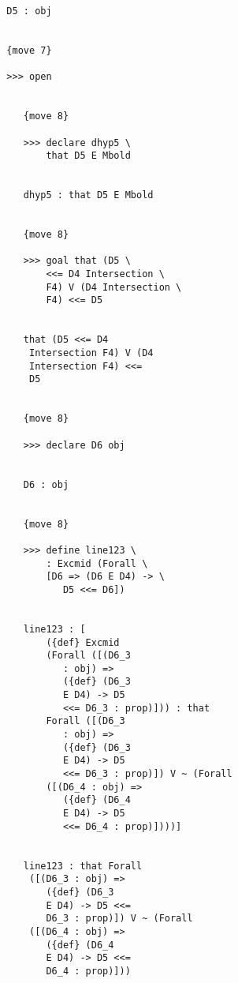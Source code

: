 \documentclass[12pt]{article}
\begin{document}
\begin{verbatim}
                     D5 : obj


                     {move 7}

                     >>> open


                        {move 8}

                        >>> declare dhyp5 \
                            that D5 E Mbold


                        dhyp5 : that D5 E Mbold


                        {move 8}

                        >>> goal that (D5 \
                            <<= D4 Intersection \
                            F4) V (D4 Intersection \
                            F4) <<= D5


                        that (D5 <<= D4 
                         Intersection F4) V (D4 
                         Intersection F4) <<= 
                         D5


                        {move 8}

                        >>> declare D6 obj


                        D6 : obj


                        {move 8}

                        >>> define line123 \
                            : Excmid (Forall \
                            [D6 => (D6 E D4) -> \
                               D5 <<= D6])


                        line123 : [
                            ({def} Excmid 
                            (Forall ([(D6_3 
                               : obj) => 
                               ({def} (D6_3 
                               E D4) -> D5 
                               <<= D6_3 : prop)])) : that 
                            Forall ([(D6_3 
                               : obj) => 
                               ({def} (D6_3 
                               E D4) -> D5 
                               <<= D6_3 : prop)]) V ~ (Forall 
                            ([(D6_4 : obj) => 
                               ({def} (D6_4 
                               E D4) -> D5 
                               <<= D6_4 : prop)])))]


                        line123 : that Forall 
                         ([(D6_3 : obj) => 
                            ({def} (D6_3 
                            E D4) -> D5 <<= 
                            D6_3 : prop)]) V ~ (Forall 
                         ([(D6_4 : obj) => 
                            ({def} (D6_4 
                            E D4) -> D5 <<= 
                            D6_4 : prop)]))



\end{verbatim}
\end{document}
